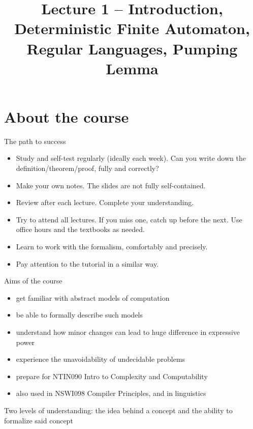 \documentclass[handout]{beamer}
\title{Lecture 1 -- Introduction, Deterministic Finite Automaton, Regular Languages, Pumping Lemma}
\begin{document}
\frame{\titlepage}


\section{About the course}


\begin{frame}{The path to success}

    \begin{itemize}    
        \item \alert{Study and self-test regularly (ideally each week).} Can you write down the definition/theorem/proof, fully and correctly?
        \item \alert{Make your own notes.} The slides are not fully self-contained.
        \item \alert{Review after each lecture.} Complete your understanding.
        \item \alert{Try to attend all lectures.} If you miss one, catch up before the next. Use office hours and the textbooks as needed.
        \item \alert{Learn to work with the formalism,} comfortably and precisely.
        \item \alert{Pay attention to the tutorial} in a similar way.

    \end{itemize}

\end{frame}


\begin{frame}{Aims of the course}

    \begin{itemize}
        \item get familiar with abstract models of computation
        \item be able to \alert{formally} describe such models
        \item understand how minor changes can lead to huge difference in expressive power
        \item experience the unavoidability of undecidable problems
        \item prepare for NTIN090 Intro to Complexity and Computability
        \item also used in NSWI098 Compiler Principles, and in linguistics
    \end{itemize}
    
    Two levels of understanding: the \alert{idea} behind a concept and the ability to \alert{formalize} said concept

\end{frame}
\end{document}
